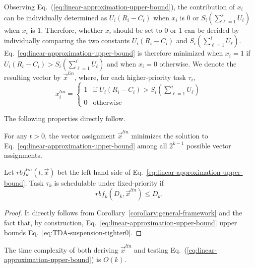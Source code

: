 Observing Eq.~(\ref{eq:linear-approximation-upper-bound}), the
contribution of $x_i$ can be individually determined as $U_i(R_i-C_i)$
when $x_i$ is $0$ or $S_i(\sum_{\ell=1}^{i}U_\ell)$ when $x_i$ is
$1$. Therefore, whether $x_i$ should be set to $0$ or $1$ can be 
decided by individually comparing the two constants
$U_i(R_i-C_i)$ and $S_i(\sum_{\ell=1}^{i}U_\ell)$. Eq.~\eqref{eq:linear-approximation-upper-bound} is therefore minimized when $x_i=1$ if $U_i(R_i-C_i) > S_i(\sum_{\ell=1}^{i}U_\ell)$ and when $x_i = 0$ otherwise. We denote the resulting vector by $\vec{x}^{\mathit{lin}}$, where, for
each higher-priority task $\tau_i$,
\begin{equation}
\label{eq:x-linear}
x_i^{\mathit{lin}} =
\begin{cases}
1 & \text{if~} U_i(R_i-C_i) > S_i(\sum_{\ell=1}^{i}U_\ell) \\
0 & \text{otherwise}
\end{cases}
\end{equation}

The following properties directly follow.
\begin{Property}
For any $t > 0$, the vector assignment $\vec{x}^{\mathit{lin}}$ minimizes
  the solution to Eq.~\eqref{eq:linear-approximation-upper-bound} among all $2^{k-1}$ possible vector assignments.
\end{Property}

\begin{theorem}
\label{theorem:linear-time-test}
Let $rbf^{\mathit{lin}}_k(t, \vec{x})$ bet the left hand side of Eq.~\eqref{eq:linear-approximation-upper-bound}. Task $\tau_k$ is schedulable
  under fixed-priority if
  \begin{equation}
    \label{eq:linear-time-test}
    rbf_k(D_k, \vec{x}^{\mathit{lin}}) \leq D_k.
  \end{equation}
\end{theorem}
\begin{proof}
It directly follows from Corollary~\ref{corollary:general-framework} and the fact that, by construction, Eq.~\eqref{eq:linear-approximation-upper-bound} upper bounds Eq.~\eqref{eq:TDA-suspension-tighter0}.
\end{proof}

\begin{Property}
The time complexity of both deriving $\vec{x}^{\mathit{lin}}$ and testing Eq.~(\ref{eq:linear-approximation-upper-bound}) is $O(k)$.
\end{Property}


  
